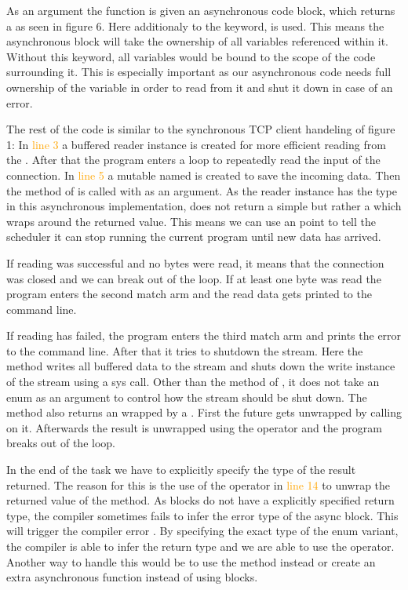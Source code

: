 As an argument the function is given an asynchronous code block, which returns a  as seen in figure 6.
Here additionaly to the  keyword,  is used. This means the asynchronous block will take the
ownership of all variables referenced within it. Without this keyword, all variables would be bound to the scope of the
code surrounding it. This is especially important as our asynchronous code needs full ownership of the 
variable in order to read from it and shut it down in case of an error.

The rest of the code is similar to the synchronous TCP client handeling of figure 1: In \textcolor{orange}{line 3} a
buffered reader instance is created for more efficient reading from the . After that the program enters
a loop to repeatedly read the input of the connection. In \textcolor{orange}{line 5} a mutable  named
 is created to save the incoming data. Then the method  of  is called with
 as an argument. As the reader instance has the type  in this asynchronous
implementation,  does not return a simple  but rather a  which wraps around
the returned value. This means we can use an  point to tell the scheduler it can stop running the current
program until new data has arrived.

If reading was successful and no bytes were read, it means that the connection was closed and we can break out of the
loop. If at least one byte was read the program enters the second match arm and the read data gets printed to the
command line.

If reading has failed, the program enters the third match arm and prints the error to the command line. After that it
tries to shutdown the stream. Here the  method writes all buffered data to the stream and shuts down the
write instance of the stream using a sys call. Other than the  method of , it
does not take an enum as an argument to control how the stream should be shut down. The method also returns an
 wrapped by a . First the future gets unwrapped by calling  on it. Afterwards the
result is unwrapped using the  operator and the program breaks out of the loop.

In the end of the task we have to explicitly specify the type of the result returned. The reason for this is the use of
the  operator in \textcolor{orange}{line 14} to unwrap the returned value of the  method. As
 blocks do not have a explicitly specified return type, the compiler sometimes fails to infer the error
type of the async block. This will trigger the compiler error . By specifying the
exact type of the  enum variant, the compiler is able to infer the return type and we are able to use the
 operator. Another way to handle this would be to use the  method instead or create an extra
asynchronous function instead of using  blocks. \cite{async-rust}

